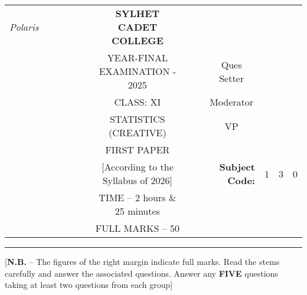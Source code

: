 \documentclass[12pt]{article}
\begin{document}
\begin{table}[]
\begin{tabular}{llllllcllrlll}
\textit{Polaris} &  &  &  &  &  & \textbf{SYLHET CADET COLLEGE}       &  &                       & \multicolumn{1}{l}{}                        &                        &                        &                        \\ \cline{10-13} 
                 &  &  &  &  &  & YEAR-FINAL EXAMINATION - 2025             &  & \multicolumn{1}{l|}{} & \multicolumn{1}{c|}{Ques Setter}            & \multicolumn{3}{l|}{}                                                    \\ \cline{10-13} 
                 &  &  &  &  &  & CLASS: XI                         &  & \multicolumn{1}{l|}{} & \multicolumn{1}{c|}{Moderator}              & \multicolumn{3}{l|}{}                                                    \\ \cline{10-13} 
                 &  &  &  &  &  & STATISTICS (CREATIVE)               &  & \multicolumn{1}{l|}{} & \multicolumn{1}{c|}{VP}                     & \multicolumn{3}{l|}{}                                                    \\ \cline{10-13} 
                 &  &  &  &  &  & FIRST PAPER                        &  &                       &                                             &                        &                        &                        \\ \cline{11-13} 
                 &  &  &  &  &  & [According to the Syllabus of 2026] &  &                       & \multicolumn{1}{r|}{\textbf{Subject Code:}} & \multicolumn{1}{l|}{1} & \multicolumn{1}{l|}{3} & \multicolumn{1}{l|}{0} \\ \cline{11-13} 
                 &  &  &  &  &  & TIME – 2 hours \& 25 minutes        &  &                       &                                             &                        &                        &                        \\
                 &  &  &  &  &  & FULL MARKS – 50                     &  &                       & \textbf{}                                   &                        &                        &                       
\end{tabular}
\end{table}

\hrule

\begin{center}
[\textbf{N.B.} – The figures of the right margin indicate full marks. Read the stems carefully and answer the associated questions. Answer any \textbf{FIVE} questions taking at least two questions from each group]\\
\end{center}
\end{document}
